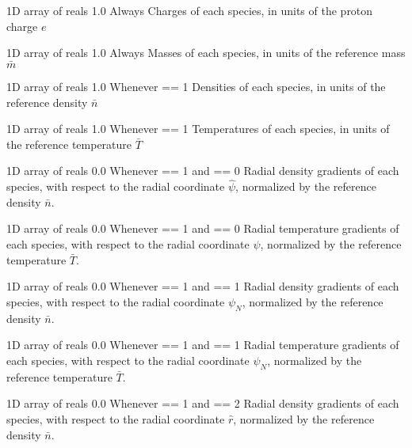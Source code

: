 \myhrule

{1D array of reals}
{1.0}
{Always}
{Charges of each species, in units of the proton charge $e$}

\myhrule

{1D array of reals}
{1.0}
{Always}
{Masses of each species, in units of the reference mass $\bar{m}$}

\myhrule

{1D array of reals}
{1.0}
{Whenever  == 1}
{Densities of each species, in units of the reference density $\bar{n}$}

\myhrule

{1D array of reals}
{1.0}
{Whenever  == 1}
{Temperatures of each species, in units of the reference temperature $\bar{T}$}

\myhrule

{1D array of reals}
{0.0}
{Whenever  == 1 and  == 0}
{Radial density gradients of each species, with respect to the radial coordinate $\hat{\psi}$, normalized by the reference density $\bar{n}$.}

\myhrule

{1D array of reals}
{0.0}
{Whenever  == 1 and  == 0}
{Radial temperature gradients of each species, with respect to the radial coordinate $\hat{\psi}$, normalized by the reference temperature $\bar{T}$.}

\myhrule

{1D array of reals}
{0.0}
{Whenever  == 1 and  == 1}
{Radial density gradients of each species, with respect to the radial coordinate $\psi_N$, normalized by the reference density $\bar{n}$.}

\myhrule

{1D array of reals}
{0.0}
{Whenever  == 1 and  == 1}
{Radial temperature gradients of each species, with respect to the radial coordinate $\psi_N$, normalized by the reference temperature $\bar{T}$.}

\myhrule

{1D array of reals}
{0.0}
{Whenever  == 1 and  == 2}
{Radial density gradients of each species, with respect to the radial coordinate $\hat{r}$, normalized by the reference density $\bar{n}$.}

